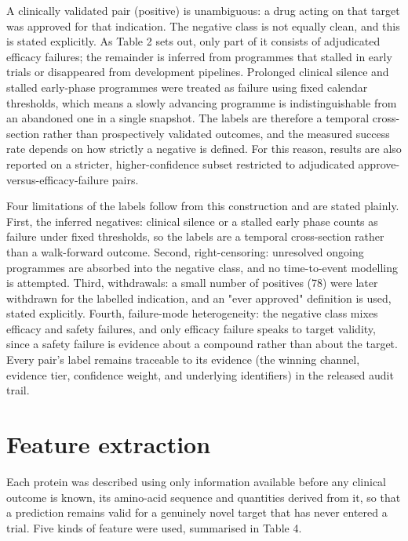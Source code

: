 \documentclass[11pt,twocolumn]{article}
\begin{document}
A clinically validated pair (positive) is unambiguous: a drug acting on that target was approved for that indication. The negative class is not equally clean, and this is stated explicitly. As Table 2 sets out, only part of it consists of adjudicated efficacy failures; the remainder is inferred from programmes that stalled in early trials or disappeared from development pipelines. Prolonged clinical silence and stalled early-phase programmes were treated as failure using fixed calendar thresholds, which means a slowly advancing programme is indistinguishable from an abandoned one in a single snapshot. The labels are therefore a temporal cross-section rather than prospectively validated outcomes, and the measured success rate depends on how strictly a negative is defined. For this reason, results are also reported on a stricter, higher-confidence subset restricted to adjudicated approve-versus-efficacy-failure pairs.

Four limitations of the labels follow from this construction and are stated plainly. First, the inferred negatives: clinical silence or a stalled early phase counts as failure under fixed thresholds, so the labels are a temporal cross-section rather than a walk-forward outcome. Second, right-censoring: unresolved ongoing programmes are absorbed into the negative class, and no time-to-event modelling is attempted. Third, withdrawals: a small number of positives (78) were later withdrawn for the labelled indication, and an "ever approved" definition is used, stated explicitly. Fourth, failure-mode heterogeneity: the negative class mixes efficacy and safety failures, and only efficacy failure speaks to target validity, since a safety failure is evidence about a compound rather than about the target. Every pair's label remains traceable to its evidence (the winning channel, evidence tier, confidence weight, and underlying identifiers) in the released audit trail.

\section{Feature extraction}

Each protein was described using only information available before any clinical outcome is known, its amino-acid sequence and quantities derived from it, so that a prediction remains valid for a genuinely novel target that has never entered a trial. Five kinds of feature were used, summarised in Table 4.
\end{document}
